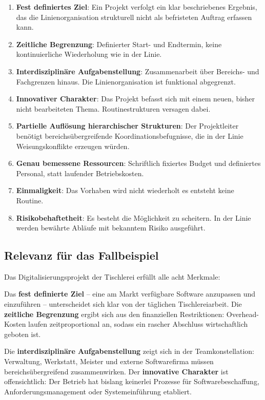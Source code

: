 \documentclass[
    a4paper,
    11pt,
    bibliography=totoc,
    listof=totoc,
    parskip=half,
    headings=normal
]{scrbook}
\begin{document}
\begin{enumerate}[noitemsep]
      \item \textbf{Fest definiertes Ziel}: Ein Projekt verfolgt ein klar beschriebenes
            Ergebnis, das die Linienorganisation strukturell nicht als befristeten Auftrag
            erfassen kann.
      \item \textbf{Zeitliche Begrenzung}: Definierter Start- und Endtermin, keine
            kontinuierliche Wiederholung wie in der Linie.
      \item \textbf{Interdisziplinäre Aufgabenstellung}: Zusammenarbeit über
            Bereichs- und Fachgrenzen hinaus. Die Linienorganisation ist funktional
            abgegrenzt.
      \item \textbf{Innovativer Charakter}: Das Projekt befasst sich mit einem neuen,
            bisher nicht bearbeiteten Thema. Routinestrukturen versagen dabei.
      \item \textbf{Partielle Auflösung hierarchischer Strukturen}: Der Projektleiter
            benötigt bereichsübergreifende Koordinationsbefugnisse, die in der Linie
            Weisungskonflikte erzeugen würden.
      \item \textbf{Genau bemessene Ressourcen}: Schriftlich fixiertes Budget und
            definiertes Personal, statt laufender Betriebskosten.
      \item \textbf{Einmaligkeit}: Das Vorhaben wird nicht wiederholt es entsteht keine Routine.
      \item \textbf{Risikobehaftetheit}: Es besteht die Möglichkeit zu scheitern. In der Linie
            werden bewährte Abläufe mit bekanntem Risiko ausgeführt\autocite[vgl.][Kap.~1]{Kiefer2010}.
\end{enumerate}

\subsection{Relevanz für das Fallbeispiel}

Das Digitalisierungsprojekt der Tischlerei erfüllt alle acht Merkmale:

Das \textbf{fest definierte Ziel} -- eine am Markt verfügbare Software anzupassen
und einzuführen -- unterscheidet sich klar von der täglichen Tischlereiarbeit.
Die \textbf{zeitliche Begrenzung} ergibt sich aus den finanziellen Restriktionen:
Overhead-Kosten laufen zeitproportional an, sodass ein rascher Abschluss
wirtschaftlich geboten ist.

Die \textbf{interdisziplinäre Aufgabenstellung} zeigt sich in der Teamkonstellation:
Verwaltung, Werkstatt, Meister und externe Softwarefirma müssen bereichsübergreifend
zusammenwirken. Der \textbf{innovative Charakter} ist offensichtlich: Der Betrieb hat
bislang keinerlei Prozesse für Softwarebeschaffung, Anforderungsmanagement oder
Systemeinführung etabliert.
\end{document}
